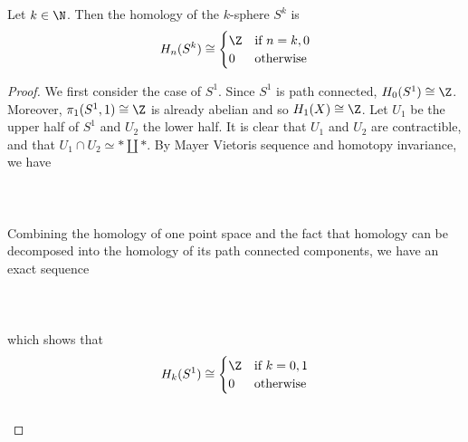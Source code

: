 \documentclass[a4paper]{article}
\begin{document}
\begin{thm}{}{} Let $k\in\N$. Then the homology of the $k$-sphere $S^k$ is $$H_n(S^k)\cong\begin{cases}
\Z & \text{if } n=k,0\\
0 & \text{otherwise}
\end{cases}$$ \tcbline
\begin{proof}
We first consider the case of $S^1$. Since $S^1$ is path connected, $H_0(S^1)\cong\Z$. Moreover, $\pi_1(S^1,1)\cong\Z$ is already abelian and so $H_1(X)\cong\Z$. Let $U_1$ be the upper half of $S^1$ and $U_2$ the lower half. It is clear that $U_1$ and $U_2$ are contractible, and that $U_1\cap U_2\simeq\ast\amalg\ast$. By Mayer Vietoris sequence and homotopy invariance, we have \\~\\
\\~\\
Combining the homology of one point space and the fact that homology can be decomposed into the homology of its path connected components, we have an exact sequence \\~\\
\\~\\
which shows that $$H_k(S^1)\cong\begin{cases}
\Z & \text{if } k=0,1\\
0 & \text{otherwise}
\end{cases}$$~\\


\end{proof}
\end{thm}
\end{document}
